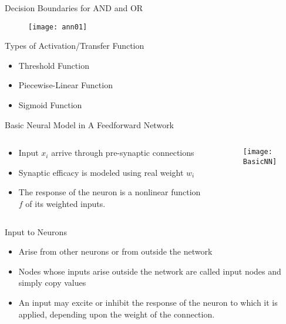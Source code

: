 \begin{frame}{Decision Boundaries for AND and OR}
\begin{figure}
\texttt{[image: ann01]}
\end{figure}
\end{frame}

\begin{frame}{Types of Activation/Transfer Function}
\begin{itemize}
\item Threshold Function
\item Piecewise-Linear Function
\item Sigmoid Function
\end{itemize}
\end{frame}

\begin{frame}{Basic Neural Model in A Feedforward Network}
\begin{adjustwidth}{-1cm}{-1cm}
\begin{columns}
\begin{column}{5cm}
\begin{itemize}
\item Input $x_i$ arrive through pre-synaptic connections
\item Synaptic efficacy is modeled using real weight $w_i$
\item The response of the neuron is a nonlinear function $f$ of its weighted inputs.
\end{itemize}
\end{column}
\begin{column}{7cm}
\begin{figure}
\texttt{[image: BasicNN]}
\end{figure}
\end{column}
\end{columns}
\end{adjustwidth}
\end{frame}

\begin{frame}{Input to Neurons}
\begin{itemize}
\item Arise from other neurons or from outside the network
\item Nodes whose inputs arise outside the network are called input nodes and simply copy values
\item An input may excite or inhibit the response of the neuron to which it is applied, depending upon the weight of the connection.
\end{itemize}
\end{frame}

